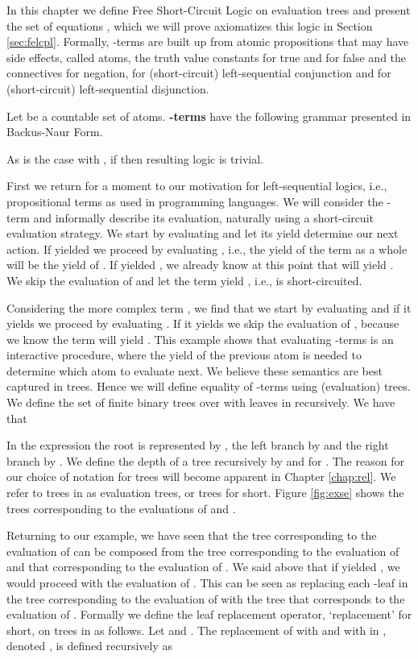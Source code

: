 In this chapter we define Free Short-Circuit Logic on evaluation trees and
present the set of equations , which we will prove axiomatizes this
logic in Section \ref{sec:felcpl}. Formally, -terms are built up from
atomic propositions that may have side effects, called atoms, the truth value
constants  for true and  for false and the connectives 
for negation,  for (short-circuit) left-sequential conjunction and
 for (short-circuit) left-sequential disjunction.
\begin{definition}
Let  be a countable set of atoms. \textbf{-terms } have the
following grammar presented in Backus-Naur Form.

\end{definition}
As is the case with , if  then resulting logic is
trivial.

First we return for a moment to our motivation for left-sequential logics,
i.e., propositional terms as used in programming languages. We will consider
the -term  and informally describe its evaluation,
naturally using a short-circuit evaluation strategy. We start by evaluating 
and let its yield determine our next action. If  yielded  we proceed
by evaluating , i.e., the yield of the term as a whole will be the yield of
. If  yielded , we already know at this point that 
will yield .  We skip the evaluation of  and let the term yield
, i.e.,  is short-circuited.

Considering the more complex term , we find that we
start by evaluating  and if it yields  we proceed by
evaluating . If it yields  we skip the evaluation of , because we
know the term will yield . This example shows that evaluating
-terms is an interactive procedure, where the yield of the previous atom
is needed to determine which atom to evaluate next. We believe these semantics
are best captured in trees. Hence we will define equality of -terms
using (evaluation) trees. We define the set  of finite binary trees over
 with leaves in  recursively. We have that

In the expression  the root is represented by , the left
branch by  and the right branch by . We define the depth of a tree 
recursively by  and  for . The reason for our choice of notation for
trees will become apparent in Chapter \ref{chap:rel}. We refer to trees in 
as evaluation trees, or trees for short.  Figure \ref{fig:exse} shows the trees
corresponding to the evaluations of  and .

Returning to our example, we have seen that the tree corresponding to the
evaluation of  can be composed from the tree
corresponding to the evaluation of  and that corresponding to the
evaluation of . We said above that if  yielded , we
would proceed with the evaluation of . This can be seen as replacing each
-leaf in the tree corresponding to the evaluation of  with
the tree that corresponds to the evaluation of . Formally we define the leaf
replacement operator, `replacement' for short, on trees in  as follows. Let
 and . The replacement of  with  and
 with  in , denoted , is defined
recursively as


